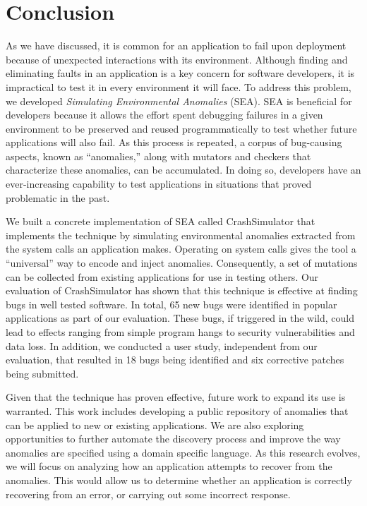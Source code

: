 \section{Conclusion}
\label{SEC:conclusion}

As we have discussed,
it is common for an application
to fail upon deployment because of unexpected interactions
with its environment.
Although finding and eliminating
faults in an application is a key concern for software developers, it is
impractical to test it in every environment it will face.
To address this problem, we developed \textit{Simulating Environmental
Anomalies} (SEA).
SEA is beneficial for developers because it allows
the effort spent debugging failures in a given environment
to be preserved and reused programmatically to test whether
future applications will also fail.
As this process is repeated,
a corpus of bug-causing aspects,
known as ``anomalies,''
along with mutators and checkers that characterize these anomalies,
can be accumulated. In doing so, developers have an ever-increasing capability
to test applications in situations
that proved problematic in the past.

We built a concrete implementation of SEA
called CrashSimulator that implements
the technique by simulating environmental
anomalies extracted from the system calls an application makes.
Operating on system calls gives the tool a ``universal'' way to
encode and inject anomalies. Consequently, a set of mutations can be
collected from existing applications for use in testing others.
Our evaluation of CrashSimulator
has shown that this technique is
effective at finding bugs in well tested software.
In total,
65 new bugs were identified in popular applications as part of our evaluation.
These bugs, if triggered in the wild,
could lead to effects ranging from simple program hangs
to security vulnerabilities and data loss.
In addition, we conducted a user study, independent from our evaluation, that resulted in 18 bugs being
identified and six corrective patches being submitted.

Given that the technique has
proven effective, future work to expand its use is warranted. This work includes
developing a public repository of anomalies
that can be applied to new or existing applications.
We are also exploring
opportunities to further automate the discovery process
and improve the way anomalies are specified using a
domain specific language.
As this research evolves, we will focus on analyzing how an
application attempts
to recover from the anomalies.  This would allow
us to determine whether
an application is correctly recovering
from an error, or carrying out some incorrect response.
